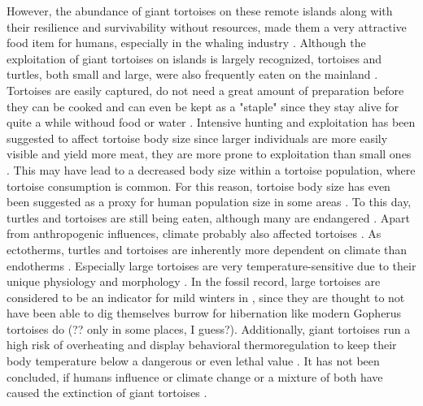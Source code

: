 
However, the abundance of giant tortoises on these remote islands along with their resilience and survivability without resources, made them a very attractive food item for humans, especially in the whaling industry \citep{.}.
Although the exploitation of giant tortoises on islands is largely recognized, tortoises and turtles, both small and large, were also frequently eaten on the mainland \citep{.}.
Tortoises are easily captured, do not need a great amount of preparation before they can be cooked and can even be kept as a "staple" since they stay alive for quite a while withoud food or water \citep{Thompson2002,Thompson2014}. Intensive hunting and exploitation has been suggested to affect tortoise body size \citep{.} since larger individuals are more easily visible and yield more meat, they are more prone to exploitation than small ones \citep{Rhodin2015}. This may have lead to a decreased body size within a tortoise population, where tortoise consumption is common.
For this reason, tortoise body size has even been suggested as a proxy for human population size in some areas \citep{Steele2005,Stiner1999,Stiner2000}.
To this day, turtles and tortoises are still being eaten, although many are endangered \citep{.}.
Apart from anthropogenic influences, climate probably also affected tortoises \citep{.}. 
As ectotherms, turtles and tortoises are inherently more dependent on climate than endotherms \citep{.}. Especially large tortoises are very temperature-sensitive due to their unique physiology and morphology \citep{Swingland1979a, Swingland1979b}. In the fossil record, large tortoises are considered to be an indicator for mild winters in \citep{Hibbard1960,Schleich1981}, since they are thought to not have been able to dig themselves burrow for hibernation like modern Gopherus tortoises do (?? only in some places, I guess?)\citep{Carlson1999, Stojanov2009}. Additionally, giant tortoises run a high risk of overheating and display behavioral thermoregulation to keep their body temperature below a dangerous or even lethal value \citep{Sturbaum1982, Schleich1981}.
It has not been concluded, if humans influence or climate change or a mixture of both have caused the extinction of giant tortoises  \citep{.}.


